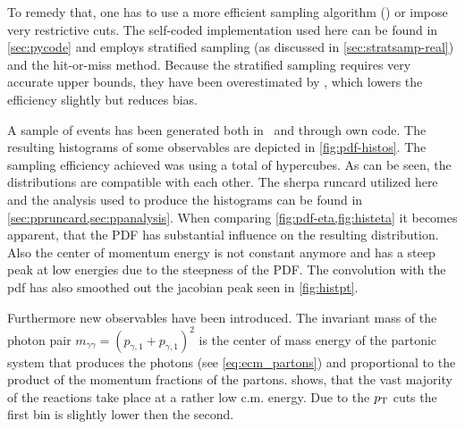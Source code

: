 To remedy that, one has to use a more efficient sampling algorithm
(\vegas) or impose very restrictive cuts. The self-coded
implementation used here can be found in \cref{sec:pycode} and employs
stratified sampling (as discussed in \cref{sec:stratsamp-real}) and
the hit-or-miss method. Because the stratified sampling requires very
accurate upper bounds, they have been overestimated by
, which lowers the efficiency
slightly but reduces bias. %

A sample of  events has been
generated both in \sherpa\ and through own code. The resulting
histograms of some observables are depicted in
\cref{fig:pdf-histos}. The sampling efficiency achieved was
 using a total of
 hypercubes.  As can be seen, the
distributions are compatible with each other. The sherpa runcard
utilized here and the analysis used to produce the histograms can be
found in \cref{sec:ppruncard,sec:ppanalysis}. When comparing
\cref{fig:pdf-eta,fig:histeta} it becomes apparent, that the PDF has
substantial influence on the resulting distribution. Also the center
of momentum energy is not constant anymore and has a steep peak at low
energies due to the steepness of the PDF. The convolution with the pdf
has also smoothed out the jacobian peak seen in \cref{fig:histpt}.

Furthermore new observables have been introduced.  The invariant mass
of the photon pair
\(m_{\gamma\gamma} = (p_{\gamma,1} + p_{\gamma,1})^2\) is the center
of mass energy of the partonic system that produces the photons (see
\cref{eq:ecm_partons}) and proportional to the product of the momentum
fractions of the partons.  shows, that the vast
majority of the reactions take place at a rather low c.m. energy. Due
to the \(p_\mathrm{T}\) cuts the first bin is slightly lower then the second.

